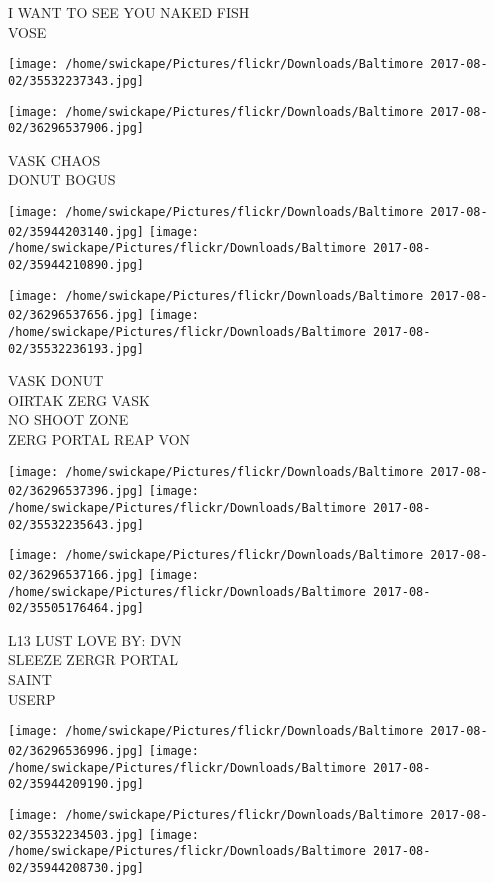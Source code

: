 \documentclass[10pt,letterpaper]{article}
\begin{document}
I WANT TO SEE YOU NAKED FISH\\
VOSE
\pagebreak

\texttt{[image: /home/swickape/Pictures/flickr/Downloads/Baltimore 2017-08-02/35532237343.jpg]}

\vspace{0.25in}
\texttt{[image: /home/swickape/Pictures/flickr/Downloads/Baltimore 2017-08-02/36296537906.jpg]}

VASK CHAOS\\
DONUT BOGUS
\pagebreak

\texttt{[image: /home/swickape/Pictures/flickr/Downloads/Baltimore 2017-08-02/35944203140.jpg]}
\texttt{[image: /home/swickape/Pictures/flickr/Downloads/Baltimore 2017-08-02/35944210890.jpg]}

\texttt{[image: /home/swickape/Pictures/flickr/Downloads/Baltimore 2017-08-02/36296537656.jpg]}
\texttt{[image: /home/swickape/Pictures/flickr/Downloads/Baltimore 2017-08-02/35532236193.jpg]}

VASK DONUT\\
OIRTAK ZERG VASK\\
NO SHOOT ZONE\\
ZERG PORTAL REAP VON
\pagebreak

\texttt{[image: /home/swickape/Pictures/flickr/Downloads/Baltimore 2017-08-02/36296537396.jpg]}
\texttt{[image: /home/swickape/Pictures/flickr/Downloads/Baltimore 2017-08-02/35532235643.jpg]}

\texttt{[image: /home/swickape/Pictures/flickr/Downloads/Baltimore 2017-08-02/36296537166.jpg]}
\texttt{[image: /home/swickape/Pictures/flickr/Downloads/Baltimore 2017-08-02/35505176464.jpg]}

L13 LUST LOVE BY: DVN\\
SLEEZE ZERGR PORTAL\\
SAINT\\
USERP
\pagebreak

\texttt{[image: /home/swickape/Pictures/flickr/Downloads/Baltimore 2017-08-02/36296536996.jpg]}
\texttt{[image: /home/swickape/Pictures/flickr/Downloads/Baltimore 2017-08-02/35944209190.jpg]}

\texttt{[image: /home/swickape/Pictures/flickr/Downloads/Baltimore 2017-08-02/35532234503.jpg]}
\texttt{[image: /home/swickape/Pictures/flickr/Downloads/Baltimore 2017-08-02/35944208730.jpg]}
\end{document}
